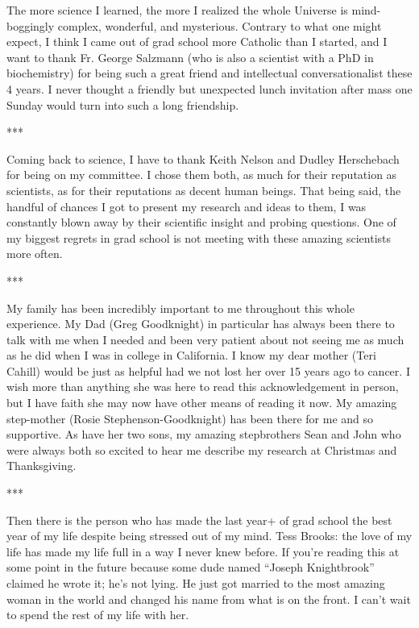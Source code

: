 The more science I learned, the more I realized the whole Universe is mind-boggingly complex, wonderful, and mysterious.  Contrary to what one might expect, I think I came out of grad school more Catholic than I started, and I want to thank Fr. George Salzmann (who is also a scientist with a PhD in biochemistry) for being such a great friend and intellectual conversationalist these 4 years.  I never thought a friendly but unexpected lunch invitation after mass one Sunday would turn into such a long friendship.

\begin{center}
   ***
\end{center}

Coming back to science, I have to thank Keith Nelson and Dudley Herschebach for being on my committee.  I chose them both, as much for their reputation as scientists, as for their reputations as decent human beings.  That being said, the handful of chances I got to present my research and ideas to them, I was constantly blown away by their scientific insight and probing questions.  One of my biggest regrets in grad school is not meeting with these amazing scientists more often.

\begin{center}
   ***
\end{center}

My family has been incredibly important to me throughout this whole experience.  My Dad (Greg Goodknight) in particular has always been there to talk with me when I needed and been very patient about not seeing me as much as he did when I was in college in California.  I know my dear mother (Teri Cahill) would be just as helpful had we not lost her over 15 years ago to cancer.  I wish more than anything she was here to read this acknowledgement in person, but I have faith she may now have other means of reading it now.  My amazing step-mother (Rosie Stephenson-Goodknight) has been there for me and so supportive.  As have her two sons, my amazing stepbrothers Sean and John who were always both so excited to hear me describe my research at Christmas and Thanksgiving.

\begin{center}
   ***
\end{center}

Then there is the person who has made the last year+ of grad school the best year of my life despite being stressed out of my mind.  Tess Brooks: the love of my life has made my life full in a way I never knew before.  If you're reading this at some point in the future because some dude named ``Joseph Knightbrook'' claimed he wrote it; he's not lying.  He just got married to the most amazing woman in the world and changed his name from what is on the front.  I can't wait to spend the rest of my life with her.


